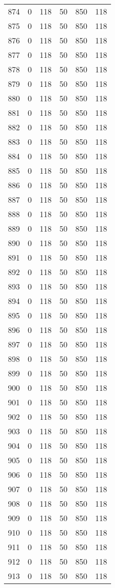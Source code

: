 \documentclass[a4paper]{ctexart}
\begin{document}
\begin{longtable}{p{1cm}|p{2cm}|p{2cm}|p{2cm}|P{2cm}|p{2cm}}
		874&0&118&50&850&118\\
		875&0&118&50&850&118\\
		876&0&118&50&850&118\\
		877&0&118&50&850&118\\
		878&0&118&50&850&118\\
		879&0&118&50&850&118\\
		880&0&118&50&850&118\\
		881&0&118&50&850&118\\
		882&0&118&50&850&118\\
		883&0&118&50&850&118\\
		884&0&118&50&850&118\\
		885&0&118&50&850&118\\
		886&0&118&50&850&118\\
		887&0&118&50&850&118\\
		888&0&118&50&850&118\\
		889&0&118&50&850&118\\
		890&0&118&50&850&118\\
		891&0&118&50&850&118\\
		892&0&118&50&850&118\\
		893&0&118&50&850&118\\
		894&0&118&50&850&118\\
		895&0&118&50&850&118\\
		896&0&118&50&850&118\\
		897&0&118&50&850&118\\
		898&0&118&50&850&118\\
		899&0&118&50&850&118\\
		900&0&118&50&850&118\\
		901&0&118&50&850&118\\
		902&0&118&50&850&118\\
		903&0&118&50&850&118\\
		904&0&118&50&850&118\\
		905&0&118&50&850&118\\
		906&0&118&50&850&118\\
		907&0&118&50&850&118\\
		908&0&118&50&850&118\\
		909&0&118&50&850&118\\
		910&0&118&50&850&118\\
		911&0&118&50&850&118\\
		912&0&118&50&850&118\\
		913&0&118&50&850&118\\

\end{longtable}
\end{document}
